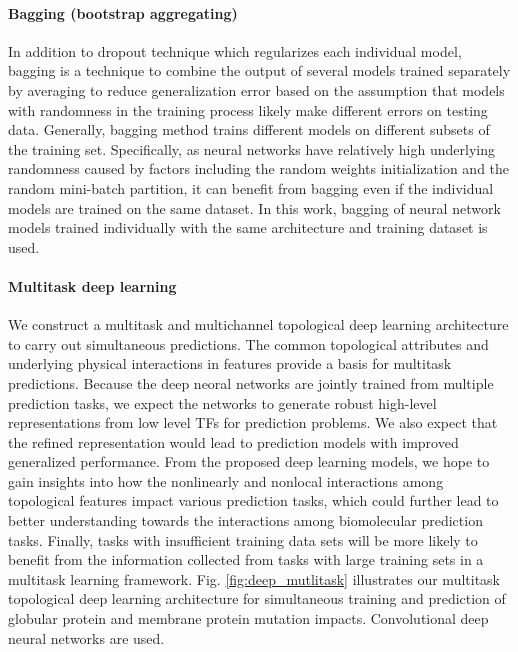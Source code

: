 \documentclass[10pt]{article}
\begin{document}
\paragraph{Bagging (bootstrap aggregating)}
In addition to dropout technique which regularizes each individual model, bagging is a technique to combine the output of several models trained separately by averaging to reduce generalization error based on the assumption that models with randomness in the training process likely make different errors on testing data. Generally, bagging method trains different models on different subsets of the training set. Specifically, as neural networks have relatively high underlying randomness caused by factors including the random weights initialization and the random mini-batch partition, it can benefit from bagging even if the individual models are trained on the same dataset. In this work, bagging of neural network models trained individually with the same architecture and training dataset is used.



\paragraph{Multitask   deep learning}

We construct a  multitask and multichannel topological deep learning  architecture to carry out simultaneous predictions. The common topological  attributes and underlying physical interactions in features provide a basis  for multitask predictions. Because the deep neoral networks are jointly trained from multiple prediction tasks, we expect the networks to generate robust high-level representations from low level TFs for prediction problems. We also expect that the refined representation would lead to prediction models with improved generalized performance. From the proposed deep learning models, we hope to  gain insights into how the nonlinearly and nonlocal  interactions among topological features  impact  various prediction tasks, which could further lead to better understanding towards the interactions among biomolecular prediction tasks. 
Finally, tasks with insufficient training data sets will be more likely to benefit from the information collected from tasks with large training sets in a multitask learning framework. Fig. \ref{fig:deep_mutlitask} illustrates our multitask topological deep learning  architecture for   simultaneous training and prediction of   globular protein and membrane protein mutation impacts. Convolutional deep neural networks are used.  
\end{document}
